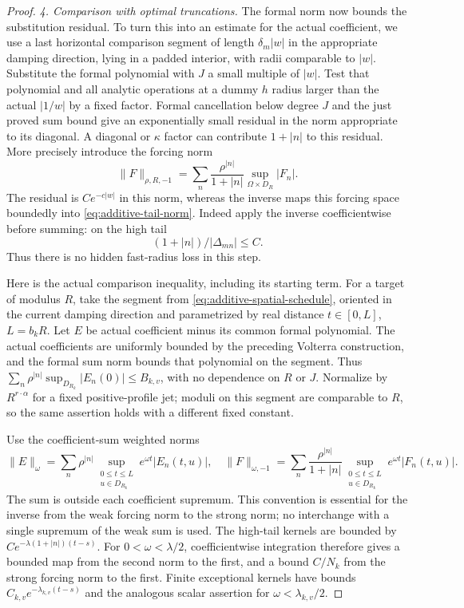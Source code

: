 \begin{proof}
\emph{4. Comparison with optimal truncations.}
The formal norm now bounds the substitution residual.  To turn this
into an estimate for the actual coefficient, we use a last horizontal
comparison segment of
length $\delta_m|w|$ in the appropriate damping direction, lying in
a padded interior, with radii comparable to $|w|$.  Substitute the
formal polynomial with $J$ a small multiple of $|w|$.  Test that
polynomial and all analytic operations at a dummy $h$ radius larger
than the actual $|1/w|$ by a fixed factor.  Formal cancellation below
degree $J$ and the just proved sum bound give an exponentially small
residual in the norm appropriate to its diagonal.  A diagonal or
$\kappa$ factor can contribute $1+|n|$ to this residual.  More precisely
introduce the forcing norm
\[
 \|F\|_{\rho,R,-1}
   =\sum_n\frac{\rho^{|n|}}{1+|n|}
       \sup_{\Omega\times D_R}|F_n|.
\]
The residual is $Ce^{-c|w|}$ in this norm, whereas the inverse maps
this forcing space boundedly into \eqref{eq:additive-tail-norm}.
Indeed apply the inverse coefficientwise before summing: on the high tail
\begin{equation}\label{eq:additive-index-cancellation}
 (1+|n|)/|\Delta_{mn}|\le C.
\end{equation}
Thus there is no hidden fast-radius loss in this step.

Here is the actual comparison inequality, including its starting term.
For a target of modulus $R$, take the segment from
\eqref{eq:additive-spatial-schedule}, oriented in the current damping
direction and parametrized by real distance $t\in[0,L]$, $L=b_kR$.
Let $E$ be actual coefficient minus its common formal polynomial.
The actual coefficients are uniformly bounded by the preceding
Volterra construction, and the formal sum norm bounds that polynomial
on the segment.  Thus
$\sum_n\rho^{|n|}\sup_{D_{R_k}}|E_n(0)|\le B_{k,v}$,
with no dependence on $R$ or $J$.  Normalize by $R^{r\cdot\alpha}$
for a fixed positive-profile jet; moduli on this segment are comparable
to $R$, so the same assertion holds with a different fixed constant.

Use the coefficient-sum weighted norms
\begin{equation}\label{eq:additive-weighted-segment}
 \|E\|_\omega=\sum_n\rho^{|n|}
       \sup_{\substack{0\le t\le L\\u\in D_{R_k}}}
                   e^{\omega t}|E_n(t,u)|,
 \quad
 \|F\|_{\omega,-1}=\sum_n\frac{\rho^{|n|}}{1+|n|}
       \sup_{\substack{0\le t\le L\\u\in D_{R_k}}}
                   e^{\omega t}|F_n(t,u)|.
\end{equation}
The sum is outside each coefficient supremum.  This convention is
essential for the inverse from the weak forcing norm to the strong
norm; no interchange with a single supremum of the weak sum is used.
The high-tail kernels are bounded by
$Ce^{-\lambda(1+|n|)(t-s)}$.  For $0<\omega<\lambda/2$, coefficientwise
integration therefore gives a bounded map from the second norm to the
first, and a bound $C/N_k$ from the strong forcing norm to the first.
Finite exceptional kernels have bounds $C_{k,v}e^{-\lambda_{k,v}(t-s)}$
and the analogous scalar assertion for $\omega<\lambda_{k,v}/2$.


\end{proof}
